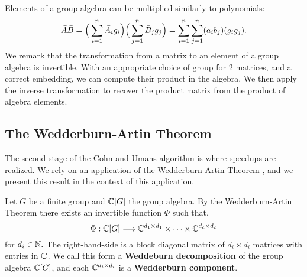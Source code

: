 \documentclass[../thesis.tex]{subfiles}
\begin{document}
Elements of a group algebra can be multiplied similarly to polynomials:
\begin{equation}\label{eq:groupalgebraproduct}
    \Bar{A}\Bar{B} = \Big(\sum_{i=1}^n \Bar{A}_ig_i\Big)\Big(\sum_{j=1}^n \Bar{B}_jg_j\Big) = \sum_{i=1}^n\sum_{j=1}^n (a_ib_j)(g_ig_j).
\end{equation}
We remark that the transformation from a matrix to an element of a group algebra is invertible. With an appropriate choice of group for 2 matrices, and a correct embedding, we can compute their product in the algebra. We then apply the inverse transformation to recover the product matrix from the product of algebra elements.

\subsection{The Wedderburn-Artin Theorem}
The second stage of the Cohn and Umans algorithm is where speedups are realized. We rely on an application of the Wedderburn-Artin Theorem \cite{hypercomplexArt}\cite{hypercomplexWedd}, and we present this result in the context of this application.

Let $G$ be a finite group and $\mathbb{C}[G]$ the group algebra. By the Wedderburn-Artin Theorem there exists an invertible function $\Phi$ such that,
\begin{equation}\label{eq:complexWAthm}
    \Phi: \mathbb{C}[G] \longrightarrow \mathbb{C}^{d_1\times d_1}\times\cdots\times\mathbb{C}^{d_c\times d_c}
\end{equation}
for $d_i\in\mathbb{N}.$ The right-hand-side is a block diagonal matrix of $d_i\times d_i$ matrices with entries in $\mathbb{C}$. We call this form a \textbf{Weddeburn decomposition} of the group algebra $\mathbb{C}[G]$, and each $\mathbb{C}^{d_i\times d_i}$ is a \textbf{Wedderburn component}.
\end{document}
